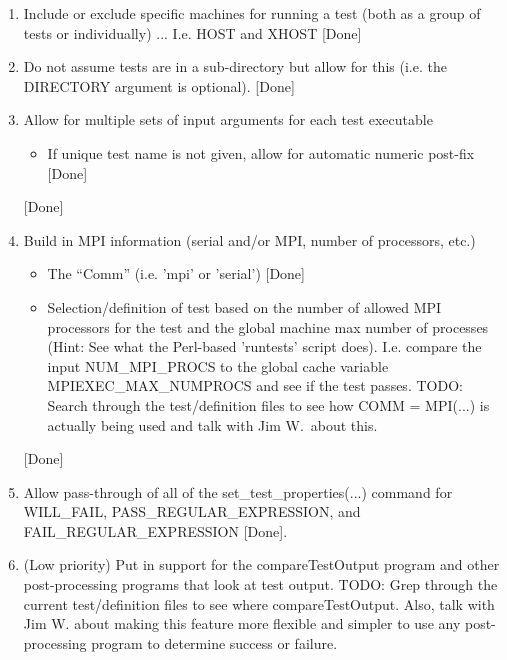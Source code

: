 \begin{enumerate}
\begin{enumerate}
  {}\item Include or exclude specific machines for running a test
  (both as a group of tests or individually) ... I.e. HOST and XHOST
  [Done]

  {}\item Do not assume tests are in a sub-directory but allow for this
  (i.e. the DIRECTORY argument is optional). [Done]

  {}\item Allow for multiple sets of input arguments for each test
  executable

    \begin{itemize}

    {}\item If unique test name is not given, allow for automatic
    numeric post-fix [Done]

    \end{itemize}

   [Done]

  {}\item Build in MPI information (serial and/or MPI, number of
  processors, etc.)

    \begin{itemize}

    {}\item The ``Comm'' (i.e. 'mpi' or 'serial') [Done]

    {}\item Selection/definition of test based on the number of allowed
    MPI processors for the test and the global machine max number of
    processes (Hint: See what the Perl-based 'runtests' script does).
    I.e. compare the input NUM\_MPI\_PROCS to the global cache variable
    MPIEXEC\_MAX\_NUMPROCS and see if the test passes.  TODO: Search
    through the test/definition files to see how COMM = MPI(...) is
    actually being used and talk with Jim W.\ about this.
	
    \end{itemize}

   [Done]

  {}\item Allow pass-through of all of the set\_test\_properties(...) 
  command for WILL\_FAIL, PASS\_REGULAR\_EXPRESSION, and
  FAIL\_REGULAR\_EXPRESSION [Done].

  {}\item (Low priority) Put in support for the compareTestOutput
  program and other post-processing programs that look at test output.
  TODO: Grep through the current test/definition files to see where
  compareTestOutput.  Also, talk with Jim W. about making this feature
  more flexible and simpler to use any post-processing program to
  determine success or failure.


\end{enumerate}
\end{enumerate}
